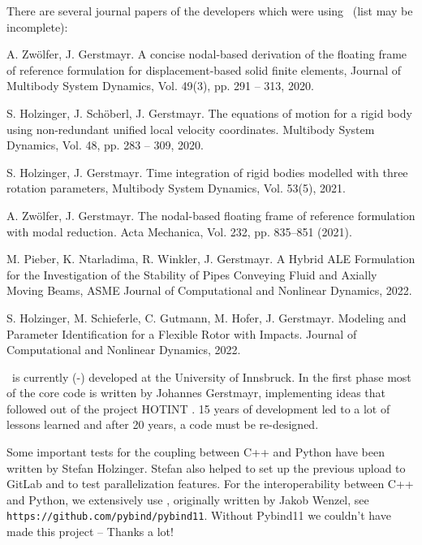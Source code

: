 There are several journal papers of the developers which were using \codeName\ (list may be incomplete):
\bi
  \item A. Zw{\"o}lfer, J. Gerstmayr. A concise nodal-based derivation of the floating frame of reference formulation for displacement-based solid finite elements, Journal of Multibody System Dynamics, Vol. 49(3), pp. 291 -- 313, 2020. 
  \item S. Holzinger, J. Sch{\"o}berl, J. Gerstmayr. The equations of motion for a rigid body using non-redundant unified local velocity coordinates. Multibody System Dynamics, Vol. 48, pp. 283 -- 309, 2020. 
  \item S. Holzinger, J. Gerstmayr. Time integration of rigid bodies modelled with three rotation parameters, Multibody System Dynamics, Vol. 53(5), 2021. 
  \item A. Zwölfer, J. Gerstmayr. The nodal-based floating frame of reference formulation with modal reduction. Acta Mechanica, Vol. 232, pp.  835--851 (2021). 
  \item M. Pieber, K. Ntarladima, R. Winkler, J. Gerstmayr. A Hybrid ALE Formulation for the Investigation of the Stability of Pipes Conveying Fluid and Axially Moving Beams, ASME Journal of Computational and Nonlinear Dynamics, 2022. 
  \item S. Holzinger, M. Schieferle, C. Gutmann, M. Hofer, J. Gerstmayr. Modeling and Parameter Identification for a Flexible Rotor with Impacts. Journal of Computational and Nonlinear Dynamics, 2022. 
\ei

\codeName\ is currently (\the\month-\the\year) developed at the University of Innsbruck.
In the first phase most of the core code is written by Johannes Gerstmayr, implementing ideas that followed out of the project HOTINT \cite{GerstmayrEtAl2013}. 15 years of development led to a lot of lessons learned and after 20 years, a code must be re-designed.

Some important tests for the coupling between C++ and Python have been written by Stefan Holzinger. Stefan also helped to set up the previous upload to GitLab and to test parallelization features.
For the interoperability between C++ and Python, we extensively use \cite{pybind11}, originally written by Jakob Wenzel, see \texttt{https://github.com/pybind/pybind11}. Without Pybind11 we couldn't have made this project -- Thanks a lot!

